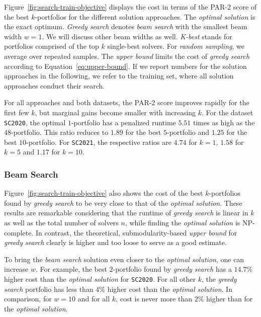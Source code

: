 \documentclass[a4paper,USenglish,pdfa]{lipics-v2021} %
\begin{document}
Figure~\ref{fig:search-train-objective} displays the cost in terms of the PAR-2 score of the best $k$-portfolios for the different solution approaches. 
The \emph{optimal solution} is the exact optimum.
\emph{Greedy search} denotes \emph{beam search} with the smallest beam width $w=1$. 
We will discuss other beam widths as well.
\emph{K-best} stands for portfolios comprised of the top $k$ single-best solvers. 
For \emph{random sampling}, we average over repeated samples.
The \emph{upper bound} limits the cost of \emph{greedy search} according to Equation~\ref{eq:upper-bound}.
If we report numbers for the solution approaches in the following, we refer to the training set, where all solution approaches conduct their search.

For all approaches and both datasets, the PAR-2 score improves rapidly for the first few $k$, but marginal gains become smaller with increasing $k$.
For the dataset \texttt{SC2020}, the optimal $1$-portfolio has a penalized runtime $5.51$ times as high as the $48$-portfolio.
This ratio reduces to $1.89$ for the best $5$-portfolio and $1.25$ for the best $10$-portfolio.
For \texttt{SC2021}, the respective ratios are $4.74$ for $k=1$, $1.58$ for $k=5$ and $1.17$ for $k=10$.

\subsubsection{Beam Search}

Figure~\ref{fig:search-train-objective} also shows the cost of the best $k$-portfolios found by \emph{greedy search} to be very close to that of the \emph{optimal solution}.
These results are remarkable considering that the runtime of \emph{greedy search} is linear in $k$ as well as the total number of solvers $n$, while finding the \emph{optimal solution} is NP-complete.
In contrast, the theoretical, submodularity-based \emph{upper bound} for \emph{greedy search} clearly is higher and too loose to serve as a good estimate.

To bring the \emph{beam search} solution even closer to the \emph{optimal solution}, one can increase $w$.
For example, the best $2$-portfolio found by \emph{greedy search} has a $14.7\%$ higher cost than the \emph{optimal solution} for \texttt{SC2020}.
For all other $k$, the \emph{greedy search} portfolio has less than $4\%$ higher cost than the \emph{optimal solution}.
In comparison, for $w=10$ and for all $k$, cost is never more than $2\%$ higher than for the \emph{optimal solution}.
\end{document}
